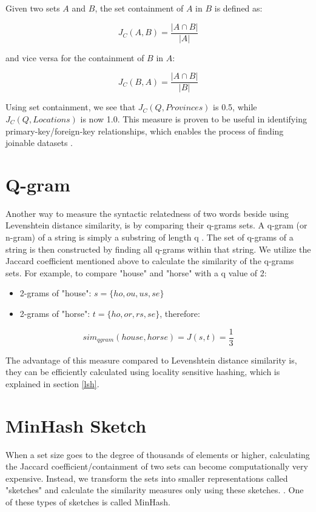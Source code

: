 Given two sets \(A\) and \(B\), the set containment of \(A\) in \(B\) is defined as:

\[
J_C(A, B) = \frac{|A \cap B|}{|A|}
\]

and vice versa for the containment of \(B\) in \(A\):

\[
J_C(B, A) = \frac{|A \cap B|}{|B|}
\]

Using set containment, we see that \(J_C(Q, Provinces)\) is 0.5, while \(J_C(Q, Locations)\) is now 1.0. This measure is proven to be useful in identifying primary-key/foreign-key relationships, which enables the process of finding joinable datasets \cite{lazo}.

\section{Q-gram}

Another way to measure the syntactic relatedness of two words beside using Levenshtein distance similarity, is by comparing their q-grams sets. A q-gram (or n-gram) of a string is simply a substring of length q \cite{qgram}. The set of q-grams of a string is then constructed by finding all q-grams within that string. We utilize the Jaccard coefficient mentioned above to calculate the similarity of the q-grams sets. For example, to compare "house" and "horse" with a q value of 2:

\begin{itemize}
    \item 2-grams of "house": \(s = \{ho, ou, us, se\}\)
    \item 2-grams of "horse": \(t = \{ho, or, rs, se\}\), therefore:
\end{itemize}

\[sim_{qgram}(house, horse) = J(s,t) = \frac{1}{3}\]

The advantage of this measure compared to Levenshtein distance similarity is, they can be efficiently calculated using locality sensitive hashing, which is explained in section \ref{lsh}.

\section{MinHash Sketch}

When a set size goes to the degree of thousands of elements or higher, calculating the Jaccard coefficient/containment of two sets can become computationally very expensive. Instead, we transform the sets into smaller representations called "sketches" and calculate the similarity measures only using these sketches. \cite{miningOfMassiveDatasets}. One of these types of sketches is called MinHash. 

